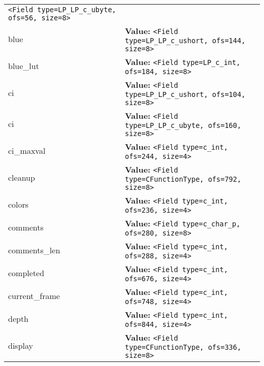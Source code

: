\begin{longtable}{|p{\varnamewidth}|p{\vardescrwidth}|l}
{\tt {\textless}Field type=LP\_LP\_c\_ubyte, ofs=56, size=8{\textgreater}}&\\
\cline{1-2}
\raggedright b\-l\-u\-e\-1\-6\- & \raggedright \textbf{Value:} 
{\tt {\textless}Field type=LP\_LP\_c\_ushort, ofs=144, size=8{\textgreater}}&\\
\cline{1-2}
\raggedright b\-l\-u\-e\-\_\-l\-u\-t\- & \raggedright \textbf{Value:} 
{\tt {\textless}Field type=LP\_c\_int, ofs=184, size=8{\textgreater}}&\\
\cline{1-2}
\raggedright c\-i\- & \raggedright \textbf{Value:} 
{\tt {\textless}Field type=LP\_LP\_c\_ushort, ofs=104, size=8{\textgreater}}&\\
\cline{1-2}
\raggedright c\-i\-8\- & \raggedright \textbf{Value:} 
{\tt {\textless}Field type=LP\_LP\_c\_ubyte, ofs=160, size=8{\textgreater}}&\\
\cline{1-2}
\raggedright c\-i\-\_\-m\-a\-x\-v\-a\-l\- & \raggedright \textbf{Value:} 
{\tt {\textless}Field type=c\_int, ofs=244, size=4{\textgreater}}&\\
\cline{1-2}
\raggedright c\-l\-e\-a\-n\-u\-p\- & \raggedright \textbf{Value:} 
{\tt {\textless}Field type=CFunctionType, ofs=792, size=8{\textgreater}}&\\
\cline{1-2}
\raggedright c\-o\-l\-o\-r\-s\- & \raggedright \textbf{Value:} 
{\tt {\textless}Field type=c\_int, ofs=236, size=4{\textgreater}}&\\
\cline{1-2}
\raggedright c\-o\-m\-m\-e\-n\-t\-s\- & \raggedright \textbf{Value:} 
{\tt {\textless}Field type=c\_char\_p, ofs=280, size=8{\textgreater}}&\\
\cline{1-2}
\raggedright c\-o\-m\-m\-e\-n\-t\-s\-\_\-l\-e\-n\- & \raggedright \textbf{Value:} 
{\tt {\textless}Field type=c\_int, ofs=288, size=4{\textgreater}}&\\
\cline{1-2}
\raggedright c\-o\-m\-p\-l\-e\-t\-e\-d\- & \raggedright \textbf{Value:} 
{\tt {\textless}Field type=c\_int, ofs=676, size=4{\textgreater}}&\\
\cline{1-2}
\raggedright c\-u\-r\-r\-e\-n\-t\-\_\-f\-r\-a\-m\-e\- & \raggedright \textbf{Value:} 
{\tt {\textless}Field type=c\_int, ofs=748, size=4{\textgreater}}&\\
\cline{1-2}
\raggedright d\-e\-p\-t\-h\- & \raggedright \textbf{Value:} 
{\tt {\textless}Field type=c\_int, ofs=844, size=4{\textgreater}}&\\
\cline{1-2}
\raggedright d\-i\-s\-p\-l\-a\-y\- & \raggedright \textbf{Value:} 
{\tt {\textless}Field type=CFunctionType, ofs=336, size=8{\textgreater}}&\\

\end{longtable}
